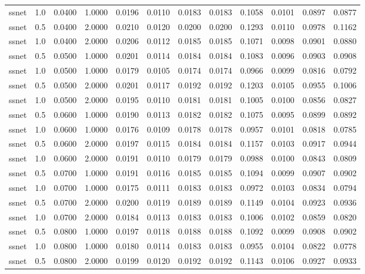 \documentclass[
]{article}
\begin{document}
\begin{longtable}[]{@{}lrrrrrrrrrrr@{}}
ssnet & 1.0 & 0.0400 & 1.0000 & 0.0196 & 0.0110 & 0.0183 & 0.0183 &
0.1058 & 0.0101 & 0.0897 & 0.0877 \\
ssnet & 0.5 & 0.0400 & 2.0000 & 0.0210 & 0.0120 & 0.0200 & 0.0200 &
0.1293 & 0.0110 & 0.0978 & 0.1162 \\
ssnet & 1.0 & 0.0400 & 2.0000 & 0.0206 & 0.0112 & 0.0185 & 0.0185 &
0.1071 & 0.0098 & 0.0901 & 0.0880 \\
ssnet & 0.5 & 0.0500 & 1.0000 & 0.0201 & 0.0114 & 0.0184 & 0.0184 &
0.1083 & 0.0096 & 0.0903 & 0.0908 \\
ssnet & 1.0 & 0.0500 & 1.0000 & 0.0179 & 0.0105 & 0.0174 & 0.0174 &
0.0966 & 0.0099 & 0.0816 & 0.0792 \\
ssnet & 0.5 & 0.0500 & 2.0000 & 0.0201 & 0.0117 & 0.0192 & 0.0192 &
0.1203 & 0.0105 & 0.0955 & 0.1006 \\
ssnet & 1.0 & 0.0500 & 2.0000 & 0.0195 & 0.0110 & 0.0181 & 0.0181 &
0.1005 & 0.0100 & 0.0856 & 0.0827 \\
ssnet & 0.5 & 0.0600 & 1.0000 & 0.0190 & 0.0113 & 0.0182 & 0.0182 &
0.1075 & 0.0095 & 0.0899 & 0.0892 \\
ssnet & 1.0 & 0.0600 & 1.0000 & 0.0176 & 0.0109 & 0.0178 & 0.0178 &
0.0957 & 0.0101 & 0.0818 & 0.0785 \\
ssnet & 0.5 & 0.0600 & 2.0000 & 0.0197 & 0.0115 & 0.0184 & 0.0184 &
0.1157 & 0.0103 & 0.0917 & 0.0944 \\
ssnet & 1.0 & 0.0600 & 2.0000 & 0.0191 & 0.0110 & 0.0179 & 0.0179 &
0.0988 & 0.0100 & 0.0843 & 0.0809 \\
ssnet & 0.5 & 0.0700 & 1.0000 & 0.0191 & 0.0116 & 0.0185 & 0.0185 &
0.1094 & 0.0099 & 0.0907 & 0.0902 \\
ssnet & 1.0 & 0.0700 & 1.0000 & 0.0175 & 0.0111 & 0.0183 & 0.0183 &
0.0972 & 0.0103 & 0.0834 & 0.0794 \\
ssnet & 0.5 & 0.0700 & 2.0000 & 0.0200 & 0.0119 & 0.0189 & 0.0189 &
0.1149 & 0.0104 & 0.0923 & 0.0936 \\
ssnet & 1.0 & 0.0700 & 2.0000 & 0.0184 & 0.0113 & 0.0183 & 0.0183 &
0.1006 & 0.0102 & 0.0859 & 0.0820 \\
ssnet & 0.5 & 0.0800 & 1.0000 & 0.0197 & 0.0118 & 0.0188 & 0.0188 &
0.1092 & 0.0099 & 0.0908 & 0.0902 \\
ssnet & 1.0 & 0.0800 & 1.0000 & 0.0180 & 0.0114 & 0.0183 & 0.0183 &
0.0955 & 0.0104 & 0.0822 & 0.0778 \\
ssnet & 0.5 & 0.0800 & 2.0000 & 0.0199 & 0.0120 & 0.0192 & 0.0192 &
0.1143 & 0.0106 & 0.0927 & 0.0933 \\

\end{longtable}
\end{document}
